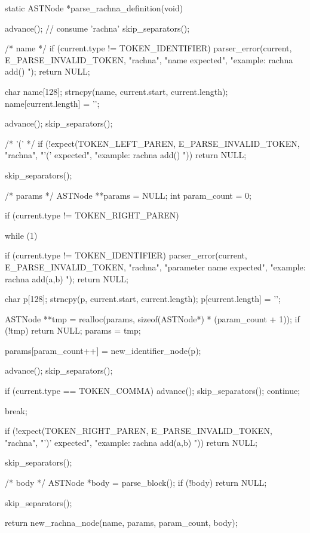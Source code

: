 \documentclass{article}
\begin{document}
static ASTNode *parse_rachna_definition(void)
{
    advance(); // consume 'rachna'
    skip_separators();

    /* name */
    if (current.type != TOKEN_IDENTIFIER) {
        parser_error(current, E_PARSE_INVALID_TOKEN,
                     "rachna",
                     "name expected",
                     "example: rachna add() { }");
        return NULL;
    }

    char name[128];
    strncpy(name, current.start, current.length);
    name[current.length] = '\0';

    advance();
    skip_separators();

    /* '(' */
    if (!expect(TOKEN_LEFT_PAREN,
                E_PARSE_INVALID_TOKEN,
                "rachna",
                "'(' expected",
                "example: rachna add() { }"))
        return NULL;

    skip_separators();

    /* params */
    ASTNode **params = NULL;
    int param_count = 0;

    if (current.type != TOKEN_RIGHT_PAREN) {
        while (1) {

            if (current.type != TOKEN_IDENTIFIER) {
                parser_error(current, E_PARSE_INVALID_TOKEN,
                             "rachna",
                             "parameter name expected",
                             "example: rachna add(a,b) { }");
                return NULL;
            }

            char p[128];
            strncpy(p, current.start, current.length);
            p[current.length] = '\0';

            ASTNode **tmp = realloc(params, sizeof(ASTNode*) * (param_count + 1));
            if (!tmp) return NULL;
            params = tmp;

            params[param_count++] = new_identifier_node(p);

            advance();
            skip_separators();

            if (current.type == TOKEN_COMMA) {
                advance();
                skip_separators();
                continue;
            }

            break;
        }
    }

    if (!expect(TOKEN_RIGHT_PAREN,
                E_PARSE_INVALID_TOKEN,
                "rachna",
                "')' expected",
                "example: rachna add(a,b) { }"))
        return NULL;

    skip_separators();

    /* body */
    ASTNode *body = parse_block();
    if (!body) return NULL;

    skip_separators();

    return new_rachna_node(name, params, param_count, body);
}
\end{document}
